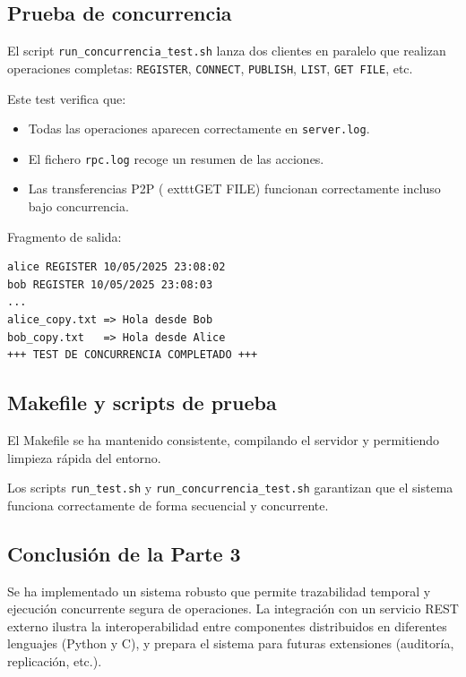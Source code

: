 \documentclass[12pt,a4paper]{article}
\begin{document}
\subsection{Prueba de concurrencia}

El script \texttt{run_concurrencia_test.sh} lanza dos clientes en paralelo que realizan operaciones completas: \texttt{REGISTER}, \texttt{CONNECT}, \texttt{PUBLISH}, \texttt{LIST}, \texttt{GET FILE}, etc.

Este test verifica que:

\begin{itemize}
\item Todas las operaciones aparecen correctamente en \texttt{server.log}.
\item El fichero \texttt{rpc.log} recoge un resumen de las acciones.
\item Las transferencias P2P (	exttt{GET FILE}) funcionan correctamente incluso bajo concurrencia.
\end{itemize}

Fragmento de salida:

\begin{verbatim}
alice REGISTER 10/05/2025 23:08:02
bob REGISTER 10/05/2025 23:08:03
...
alice_copy.txt => Hola desde Bob
bob_copy.txt   => Hola desde Alice
+++ TEST DE CONCURRENCIA COMPLETADO +++
\end{verbatim}

\subsection{Makefile y scripts de prueba}

El Makefile se ha mantenido consistente, compilando el servidor y permitiendo limpieza rápida del entorno.

Los scripts \texttt{run_test.sh} y \texttt{run_concurrencia_test.sh} garantizan que el sistema funciona correctamente de forma secuencial y concurrente.

\subsection{Conclusión de la Parte 3}

Se ha implementado un sistema robusto que permite trazabilidad temporal y ejecución concurrente segura de operaciones. La integración con un servicio REST externo ilustra la interoperabilidad entre componentes distribuidos en diferentes lenguajes (Python y C), y prepara el sistema para futuras extensiones (auditoría, replicación, etc.).
\end{document}
